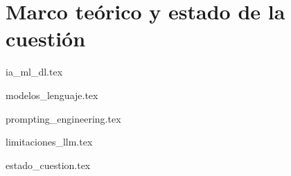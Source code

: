 \chapter{Marco teórico y estado de la cuestión}





{ia_ml_dl.tex}

{modelos_lenguaje.tex}

{prompting_engineering.tex}

{limitaciones_llm.tex}

{estado_cuestion.tex} 







